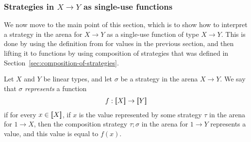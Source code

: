 \subsubsection{Strategies in $X \to Y$ as single-use functions}
We now move to the main point of this section, which is to show how to interpret a strategy in the arena for $X \to Y$ as a single-use function of type $X \to Y$. This is done by using the definition from for values in the previous section, and then lifting it to functions by using composition of strategies that was defined in Section~\ref{sec:composition-of-strategies}.


\begin{definition}\label{def:strategy-as-single-use-function}
    Let $X$ and $Y$ be linear types, and let $\sigma$ be a strategy in the arena $X \to Y$. We say that $\sigma$ \emph{represents} a function  
    \begin{align*}
    f : [{\kern-0.45ex}[X]{\kern-0.45ex}] \to [{\kern-0.45ex}[Y]{\kern-0.45ex}]
    \end{align*}
    if for every $x \in [{\kern-0.45ex}[X]{\kern-0.45ex}]$, if  $x$ is the value  represented by some strategy $\tau$ in the arena for $1 \to X$, then the composition strategy $\tau;\sigma$ in the arena for $1 \to Y$ represents a value, and this value is equal to $f(x)$.
\end{definition}

